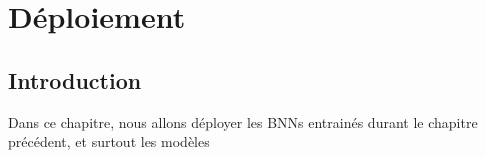 \chapter{Déploiement}

\section{Introduction}
Dans ce chapitre, nous allons déployer les BNNs entrainés durant le chapitre précédent, et surtout les modèles 